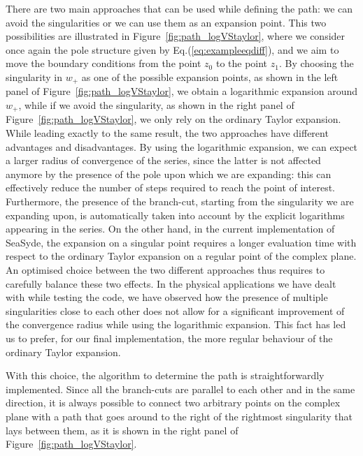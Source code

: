 \documentclass[final,1p,times]{elsarticle}
\begin{document}
There are two main approaches that can be used while defining the path: we can avoid the singularities or we can use them as an expansion point.
This two possibilities are illustrated in Figure~\ref{fig:path_logVStaylor}, where we consider once again the pole structure given by Eq.(\ref{eq:exampleeqdiff}), and we aim to move the boundary conditions from the point $z_0$ to the point $z_1$.
By choosing the singularity in $w_+$ as one of the possible expansion points, as shown in the left panel of Figure~\ref{fig:path_logVStaylor}, we obtain a logarithmic expansion around $w_+$, while if we avoid the singularity, as shown in the right panel of Figure~\ref{fig:path_logVStaylor}, we only rely on the ordinary Taylor expansion.
While leading exactly to the same result, the two approaches have different advantages and disadvantages.
By using the logarithmic expansion, we can expect a larger radius of convergence of the series, since the latter is not affected anymore by the presence of the pole upon which we are expanding: this can effectively reduce the number of steps required to reach the point of interest.
Furthermore, the presence of the branch-cut, starting from the singularity we are expanding upon, is automatically taken into account by the explicit logarithms appearing in the series.
On the other hand, in the current implementation of {\sc SeaSyde}, the expansion on a singular point requires a longer evaluation time with respect to the ordinary Taylor expansion on a regular point of the complex plane.
An optimised choice between the two different approaches thus requires to carefully balance these two effects.
In the physical applications we have dealt with while testing the code, we have observed how the presence of multiple singularities close to each other does not allow for a significant improvement of the convergence radius while using the logarithmic expansion. This fact has led us to prefer, for our final implementation, the more regular behaviour of the ordinary Taylor expansion.

With this choice, the algorithm to determine the path is straightforwardly implemented.
Since all the branch-cuts are parallel to each other and in the same direction, it is always possible to connect two arbitrary points on the complex plane with a path that goes around to the right of the rightmost singularity that lays between them, as it is shown in the right panel of Figure~\ref{fig:path_logVStaylor}. 
\end{document}
